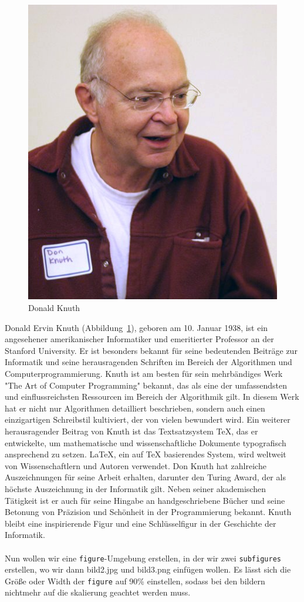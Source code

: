\documentclass{scrartcl}
\begin{document}
\begin{figure}[h]
\centering
\includegraphics[scale=.5]{bild1.jpg}
\caption{Donald Knuth}
\label{fig:donknuth}
\end{figure}

Donald Ervin Knuth (Abbildung~\ref{fig:donknuth}), geboren am 10. Januar 1938, ist ein angesehener amerikanischer Informatiker und emeritierter Professor an der Stanford University. Er ist besonders bekannt für seine bedeutenden Beiträge zur Informatik und seine herausragenden Schriften im Bereich der Algorithmen und Computerprogrammierung.  Knuth ist am besten für sein mehrbändiges Werk "The Art of Computer Programming" bekannt, das als eine der umfassendsten und einflussreichsten Ressourcen im Bereich der Algorithmik gilt. In diesem Werk hat er nicht nur Algorithmen detailliert beschrieben, sondern auch einen einzigartigen Schreibstil kultiviert, der von vielen bewundert wird.  Ein weiterer herausragender Beitrag von Knuth ist das Textsatzsystem TeX, das er entwickelte, um mathematische und wissenschaftliche Dokumente typografisch ansprechend zu setzen. LaTeX, ein auf TeX basierendes System, wird weltweit von Wissenschaftlern und Autoren verwendet.  Don Knuth hat zahlreiche Auszeichnungen für seine Arbeit erhalten, darunter den Turing Award, der als höchste Auszeichnung in der Informatik gilt. Neben seiner akademischen Tätigkeit ist er auch für seine Hingabe an handgeschriebene Bücher und seine Betonung von Präzision und Schönheit in der Programmierung bekannt. Knuth bleibt eine inspirierende Figur und eine Schlüsselfigur in der Geschichte der Informatik.\\
\\
Nun wollen wir eine \texttt{figure}-Umgebung erstellen, in der wir zwei \texttt{subfigures} erstellen, wo wir dann bild2.jpg und bild3.png einfügen wollen. Es lässt sich die Größe oder Width der \texttt{figure} auf 90\% einstellen, sodass bei den bildern nichtmehr auf die skalierung geachtet werden muss. \\
\end{document}
